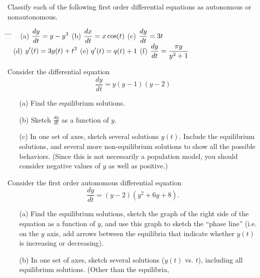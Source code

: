\newpage

\begin{exercises}
\begin{exercise}
\label{ex:AutFirstOrder_autclassify}
Classify each of the following first order differential equations
as autonomous or nonautonomous.

\medskip
\begin{tabbing}
\hspace*{0.25in} \= \hspace*{1.5in} \= \hspace*{1.5in} \= \kill
~ \> 
(a) $\displaystyle \frac{dy}{dt} = y - y^3$ \>
(b) $\displaystyle \frac{dx}{dt} = x\cos(t)$ \>
(c) $\displaystyle \frac{dy}{dt} = 3t$ \\[2pt]
~ \>
(d) $\displaystyle y'(t) = 3y(t) + t^2$ \>
(e) $\displaystyle q'(t) = q(t) + 1$ \>
(f) $\displaystyle \frac{dy}{dt} = \frac{\pi y}{y^2+1}$
\end{tabbing}
\end{exercise}
\begin{exercise}
Consider the differential equation
\[
   \frac{dy}{dt} = y(y-1)(y-2)
\]
\begin{enumerate}
\item[(a)] Find the equilibrium solutions.\\
\item[(b)] Sketch $\frac{dy}{dt}$ as a function of $y$.\\
\item[(c)] In one set of axes, sketch several solutions $y(t)$. Include the equilibrium solutions,
and several more non-equilibrium solutions to show all the possible behaviors.
(Since this is not necessarily a population model, you should consider negative values
of $y$ as well as positive.)
\end{enumerate}
\end{exercise}
\begin{exercise}
\label{ex:AutonomousDegreeThree}
Consider the first order autonomous differential equation
\[
   \frac{dy}{dt} = (y-2)(y^2+6y+8).
\]
\begin{enumerate}
\item[(a)] Find the equilibrium solutions, 
sketch the graph  of the right side of the equation as a function
of $y$, and use this graph to sketch the ``phase line''
(i.e. on the $y$ axis, add arrows between the equilibria
that indicate whether $y(t)$ is increasing or decreasing).
\item[(b)] In one set of axes, sketch several solutions ($y(t)$ vs. $t$), including
all equilibrium solutions.
(Other than the equilibria,

\end{enumerate}
\end{exercise}
\end{exercises}
